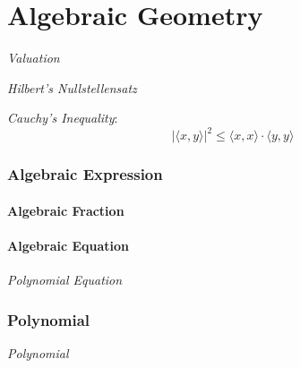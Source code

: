 \part{Algebraic Geometry}\label{sec:algebraic_geometry}

\emph{Valuation}

\emph{Hilbert's Nullstellensatz}

\emph{Cauchy's Inequality}:
\[
    |\langle x,y \rangle|^2 \leq \langle x,x \rangle \cdot \langle
    y,y \rangle
\]



\section{Algebraic Expression}\label{sec:algebraic_expression}

\subsection{Algebraic Fraction}\label{sec:algebraic_fraction}

\subsection{Algebraic Equation}\label{sec:algebraic_equation}

\emph{Polynomial Equation}



\section{Polynomial}\label{sec:polynomial}

\emph{Polynomial}

